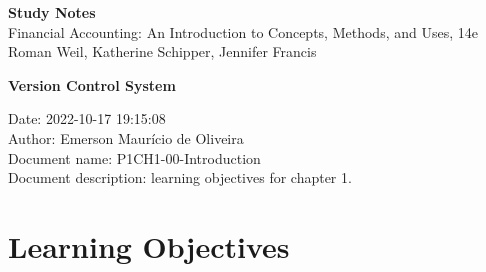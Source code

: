 \documentclass{article}\usepackage[]{graphicx}\usepackage[]{xcolor}
\begin{document}
\setlength{\abovedisplayskip}{0pt}
\setlength{\belowdisplayskip}{0pt}
\setlength{\abovedisplayshortskip}{0pt}
\setlength{\belowdisplayshortskip}{0pt}



\begin{center}
\LARGE
\textbf{Study Notes}\\
\vspace{0.5 cm}
\large
Financial Accounting: An Introduction to Concepts, Methods, and Uses, 14e\\
Roman Weil, Katherine Schipper, Jennifer Francis
\end{center}

\vspace{0.5 cm}

\textbf{Version Control System}\par

Date: 2022-10-17 19:15:08\\
Author: Emerson Maurício de Oliveira\\
Document name: P1CH1-00-Introduction\\
Document description: learning objectives for chapter 1.\par

\section*{Learning Objectives}
\end{document}
